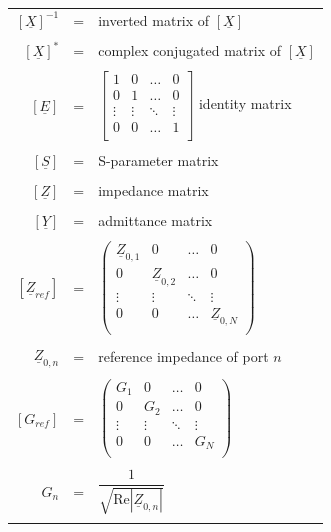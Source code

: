 \begin{tabular}{rll}
$\left[\underline{X}\right]^{-1}$ & = & 
inverted matrix of $\left[\underline{X}\right]$\\& &\\
$\left[\underline{X}\right]^{*}$ & = & 
complex conjugated matrix of $\left[\underline{X}\right]$\\& &\\
$\left[\underline{E}\right]$ & = &
$\begin{bmatrix}
1 & 0 & \ldots & 0\\
0 & 1 & \ldots & 0\\
\vdots & \vdots & \ddots & \vdots\\
0 & 0 & \ldots & 1\\
\end{bmatrix}$
identity matrix\\& &\\
$\left[\underline{S}\right]$ & = & S-parameter matrix\\& &\\
$\left[\underline{Z}\right]$ & = & impedance matrix\\& &\\
$\left[\underline{Y}\right]$ & = & admittance matrix\\& &\\
$\left[\underline{Z}_{ref}\right]$ & = &
$\begin{pmatrix}
\underline{Z}_{0,1} & 0 & \ldots & 0\\
0 & \underline{Z}_{0,2} & \ldots & 0\\
\vdots & \vdots & \ddots & \vdots\\
0 & 0 & \ldots & \underline{Z}_{0,N}\\
\end{pmatrix}$\\& &\\
$\underline{Z}_{0,n}$ & = &
reference impedance of port $n$\\& &\\
$\left[G_{ref}\right]$ & = &
$\begin{pmatrix}
G_1 & 0 & \ldots & 0\\
0 & G_2 & \ldots & 0\\
\vdots & \vdots & \ddots & \vdots\\
0 & 0 & \ldots & G_N\\
\end{pmatrix}$\\& &\\
$G_n$ & = &
$\dfrac{1}{\sqrt{\text{Re}\left|\underline{Z}_{0,n}\right|}}$\\& &\\
\end{tabular}

